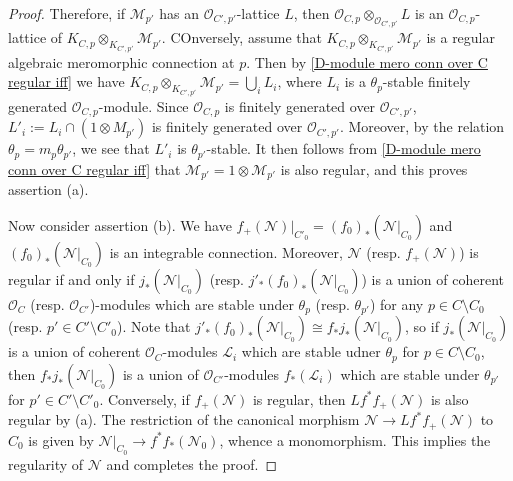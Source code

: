 \begin{proof}
Therefore, if $\mathscr{M}_{p'}$ has an $\mathscr{O}_{C',p'}$-lattice $L$, then $\mathscr{O}_{C,p}\otimes_{\mathscr{O}_{C',p'}}L$ is an $\mathscr{O}_{C,p}$-lattice of $K_{C,p}\otimes_{K_{C',p'}}\mathscr{M}_{p'}$. COnversely, assume that $K_{C,p}\otimes_{K_{C',p'}}\mathscr{M}_{p'}$ is a regular algebraic meromorphic connection at $p$. Then by \cref{D-module mero conn over C regular iff} we have $K_{C,p}\otimes_{K_{C',p'}}\mathscr{M}_{p'}=\bigcup_iL_i$, where $L_i$ is a $\theta_p$-stable finitely generated $\mathscr{O}_{C,p}$-module. Since $\mathscr{O}_{C,p}$ is finitely generated over $\mathscr{O}_{C',p'}$, $L'_i:=L_i\cap(1\otimes M_{p'})$ is finitely generated over $\mathscr{O}_{C',p'}$. Moreover, by the relation $\theta_p=m_p\theta_{p'}$, we see that $L'_i$ is $\theta_{p'}$-stable. It then follows from \cref{D-module mero conn over C regular iff} that $\mathscr{M}_{p'}=1\otimes\mathscr{M}_{p'}$ is also regular, and this proves assertion (a).\par
Now consider assertion (b). We have $f_+(\mathscr{N})|_{C'_0}=(f_0)_*(\mathscr{N}|_{C_0})$ and $(f_0)_*(\mathscr{N}|_{C_0})$ is an integrable connection. Moreover, $\mathscr{N}$ (resp. $f_+(\mathscr{N})$) is regular if and only if $j_*(\mathscr{N}|_{C_0})$ (resp. $j'_*(f_0)_*(\mathscr{N}|_{C_0})$) is a union of coherent $\mathscr{O}_C$ (resp. $\mathscr{O}_{C'}$)-modules which are stable under $\theta_p$ (resp. $\theta_{p'}$) for any $p\in C\setminus C_0$ (resp. $p'\in C'\setminus C'_0$). Note that $j'_*(f_0)_*(\mathscr{N}|_{C_0})\cong f_*j_*(\mathscr{N}|_{C_0})$, so if $j_*(\mathscr{N}|_{C_0})$ is a union of coherent $\mathscr{O}_C$-modules $\mathscr{L}_i$ which are stable udner $\theta_p$ for $p\in C\setminus C_0$, then $f_*j_*(\mathscr{N}|_{C_0})$ is a union of $\mathscr{O}_{C'}$-modules $f_*(\mathscr{L}_i)$ which are stable under $\theta_{p'}$ for $p'\in C'\setminus C'_0$. Conversely, if $f_+(\mathscr{N})$ is regular, then $Lf^*f_+(\mathscr{N})$ is also regular by (a). The restriction of the canonical morphism $\mathscr{N}\to Lf^*f_+(\mathscr{N})$ to $C_0$ is given by $\mathscr{N}|_{C_0}\to f^*f_*(\mathscr{N}_0)$, whence a monomorphism. This implies the regularity of $\mathscr{N}$ and completes the proof.
\end{proof}

